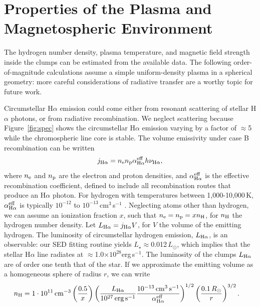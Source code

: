 \documentclass[11pt,twocolumn,tighten]{aastex7}
\begin{document}
\section{Properties of the Plasma and Magnetospheric Environment}
\label{subsec:gas}

The hydrogen number density, plasma temperature, and magnetic field
strength inside the clumps can be estimated from the available data.  
The following order-of-magnitude calculations assume a simple
uniform-density plasma in a spherical geometry: more careful
considerations of radiative transfer are a worthy topic for future
work.

Circumstellar H$\alpha$ emission could come either from resonant
scattering of stellar H$\alpha$ photons, or from radiative
recombination.  We neglect scattering because Figure~\ref{fig:spec}
shows the
circumstellar H$\alpha$ emission varying by a factor of $\approx$5
while the chromospheric line core is stable.  The volume emissivity
under case B recombination can be written \begin{equation}
  j_{\rm H\alpha} = n_{\rm e} n_{\rm p} \alpha^{\rm eff}_{\rm H\alpha} h \nu_{\rm H\alpha},
\end{equation} where $n_{\rm e}$ and $n_{\rm p}$ are the electron and
proton densities, and $\alpha^{\rm eff}_{\rm H\alpha}$ is the
effective recombination coefficient, defined to include all
recombination routes that produce an H$\alpha$ photon.  For hydrogen
with temperatures between 1,000-10,000\,K, $\alpha^{\rm eff}_{\rm
H\alpha}$ is typically $10^{-12}$ to
$10^{-13}$\,cm$^3$\,s$^{-1}$ \citep{Hummer1987,Draine2011}.
Neglecting atoms other than hydrogen, we can assume an
ionization fraction $x$, such that $n_{\rm e} = n_{\rm p} = x n_{\rm
H}$, for $n_{\rm H}$ the hydrogen number density.  Let $L_{\rm
H\alpha} = j_{\rm H\alpha} V$, for $V$ the volume of the emitting
hydrogen.  The luminosity of circumstellar hydrogen emission, $L_{\rm
H\alpha}$, is an observable: our SED fitting routine yields
$L_\star$$\approx$0.012\,$L_\odot$, which implies that the stellar
H$\alpha$ line radiates at $\approx$1.0$\times$$10^{28}$erg\,s$^{-1}$.
The luminosity of the clumps $L_{\rm H\alpha}$ are of order one tenth
that of the star.  If we approximate the emitting volume as a
homogeneous sphere of radius $r$, we can write
\begin{align}
  n_{\rm H} &= 
  1 \cdot 10^{11}\,{\rm cm}^{-3}
  \left(
    \frac{0.5}{x}
  \right)
  \left( 
    \frac{ L_{\rm H\alpha} }{ 10^{27}\,{\rm erg\,s^{-1}} }
    \frac{ 10^{-13}\,{\rm cm^{3}\,s^{-1}} }{ \alpha^{\rm eff}_{\rm H\alpha} }
  \right)^{1/2}
  \left(
    \frac{ 0.1\,R_\odot }{ r }
  \right)^{3/2}.
  \label{eq:numdensity}
\end{align}
\end{document}
